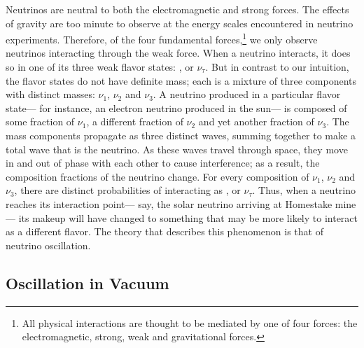 Neutrinos are neutral to both the electromagnetic and strong forces.
The effects of gravity are too minute to observe at the energy scales
encountered in neutrino experiments.
Therefore, of the four fundamental forces,\footnote{All physical interactions
are thought to be mediated by one of four forces: the electromagnetic,
strong, weak and gravitational forces.} we only observe neutrinos interacting
through the weak force.
When a neutrino interacts, it does so in one of its three weak flavor states:
\nue, \numu or $\nu_\tau$.
But in contrast to our intuition, the flavor states do not have definite mass;
each is a mixture of three components with distinct masses: $\nu_1$, $\nu_2$
and $\nu_3$.
A neutrino produced in a particular flavor state--- for instance, an electron
neutrino produced in the sun--- is composed of some fraction of $\nu_1$, a
different fraction of $\nu_2$ and yet another fraction of $\nu_3$.
The mass components propagate as three distinct waves, summing together to make
a total wave that is the neutrino.
As these waves travel through space, they move in and out of phase with each
other to cause interference; as a result, the composition fractions of the
neutrino change.
For every composition of $\nu_1$, $\nu_2$ and $\nu_3$, there are distinct
probabilities of interacting as \nue, \numu or $\nu_\tau$.
Thus, when a neutrino reaches its interaction point--- say, the solar neutrino
arriving at Homestake mine--- its makeup will have changed to something that
may be more likely to interact as a different flavor.
The theory that describes this phenomenon is that of neutrino oscillation.

\subsection{Oscillation in Vacuum}

